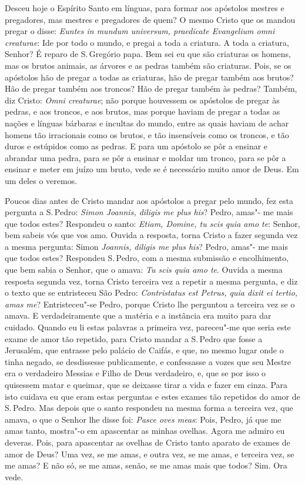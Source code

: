 Desceu hoje o Espírito Santo em línguas, para formar aos apóstolos
mestres e pregadores, mas mestres e pregadores de quem? O mesmo Cristo
que os mandou pregar o disse: \emph{Euntes in mundum universum,
praedicate Evangelium omni creaturae}: Ide por todo o %
mundo, e pregai a toda a criatura.
A toda a criatura, Senhor? É reparo de S.\,Gregório papa. Bem
sei eu que são criaturas os homens, mas os brutos animais, as árvores e
as pedras também são criaturas. Pois, se os apóstolos hão de pregar a
todas as criaturas, hão de pregar também aos brutos? Hão de pregar
também aos troncos? Hão de pregar também às pedras? Também, diz Cristo:
\emph{Omni creaturae}; não porque houvessem os apóstolos de pregar às
pedras, e aos troncos, e aos brutos, mas porque haviam de pregar a todas
as nações e línguas bárbaras e incultas do mundo, entre as quais haviam
de achar homens tão irracionais como os brutos, e tão insensíveis como
os troncos, e tão duros e estúpidos como as pedras. E para um apóstolo
se pôr a ensinar e abrandar uma pedra, para se pôr a ensinar e moldar um
tronco, para se pôr a ensinar e meter em juízo um bruto, vede se é
necessário muito amor de Deus. Em um deles o veremos.

Poucos dias antes de Cristo mandar aos apóstolos a pregar pelo mundo,
fez esta pergunta a S.\,Pedro: \emph{Simon Joannis, diligis me plus his}?%
 Pedro, amas"- me mais que todos estes? Respondeu o santo:
\emph{Etiam, Domine, tu scis quia amo te}: Senhor, bem sabeis vós que
vos amo. Ouvida a resposta, torna Cristo a fazer segunda vez a mesma
pergunta: Simon \emph{Joannis, diligis me plus his}? Pedro, amas"- me
mais que todos estes? Respondeu S.\,Pedro, com a mesma submissão e
encolhimento, que bem sabia o Senhor, que o amava: \emph{Tu scis quia
amo te}. Ouvida a mesma resposta segunda vez, torna Cristo terceira vez
a repetir a mesma pergunta, e diz o texto que se entristeceu São Pedro:
\emph{Contristatus est Petrus, quia dixit ei tertio, amas me}? Entristeceu"-se Pedro,
porque Cristo lhe perguntou a terceira vez se o amava. E
verdadeiramente que a matéria e a instância era muito para dar cuidado.
Quando eu li estas palavras a primeira vez, pareceu"-me que seria este
exame de amor tão repetido, para Cristo mandar a S.\,Pedro que fosse a
Jerusalém, que entrasse pelo palácio de Caifás, e que, no mesmo lugar
onde o tinha negado, se desdissesse publicamente, e confessasse a vozes
que seu Mestre era o verdadeiro Messias e Filho de Deus verdadeiro, e,
que se por isso o quisessem matar e queimar, que se deixasse tirar a
vida e fazer em cinza. Para isto cuidava eu que eram estas perguntas e
estes exames tão repetidos do amor de S.\,Pedro. Mas depois que o santo
respondeu na mesma forma a terceira vez, que amava, o que o Senhor lhe
disse foi: \emph{Pasce oves meas}: Pois, Pedro, já que me %
amas tanto, mostra"-o em apascentar as minhas ovelhas. Agora me
admiro eu deveras. Pois, para apascentar as ovelhas de Cristo tanto
aparato de exames de amor de Deus? Uma vez, se me amas, e outra vez, se
me amas, e terceira vez, se me amas? E não só, se me amas, senão, se me
amas mais que todos? Sim. Ora vede.

